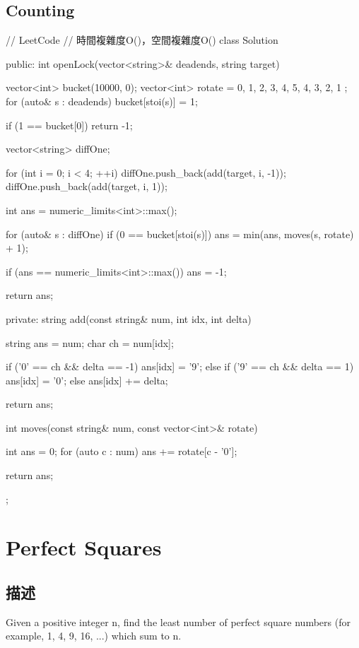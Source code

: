 \subsection{Counting}
\begin{Code}
// LeetCode
// 時間複雜度O()，空間複雜度O()
class Solution {
public:
    int openLock(vector<string>& deadends, string target) {
        vector<int> bucket(10000, 0);
        vector<int> rotate = { 0, 1, 2, 3, 4, 5, 4, 3, 2, 1 };
        for (auto& s : deadends) {
            bucket[stoi(s)] = 1;
        }

        if (1 == bucket[0]) return -1;

        vector<string> diffOne;

        for (int i = 0; i < 4; ++i) {
            diffOne.push_back(add(target, i, -1));
            diffOne.push_back(add(target, i, 1));
        }

        int ans = numeric_limits<int>::max();

        for (auto& s : diffOne) {
            if (0 == bucket[stoi(s)]) {
                ans = min(ans, moves(s, rotate) + 1);
            }
        }

        if (ans == numeric_limits<int>::max()) ans = -1;

        return ans;
    }

private:
    string add(const string& num, int idx, int delta)
    {
        string ans = num;
        char ch = num[idx];

        if ('0' == ch && delta == -1) {
            ans[idx] = '9';
        }
        else if ('9' == ch && delta == 1) {
            ans[idx] = '0';
        }
        else {
            ans[idx] += delta;
        }

        return ans;
    }

    int moves(const string& num, const vector<int>& rotate)
    {
        int ans = 0;
        for (auto c : num) {
            ans += rotate[c - '0'];
        }

        return ans;
    }
};
\end{Code}

\section{Perfect Squares}
\label{sec:perfect-squares}

\subsection{描述}
Given a positive integer n, find the least number of perfect square numbers (for example, 1, 4, 9, 16, ...) which sum to n.


